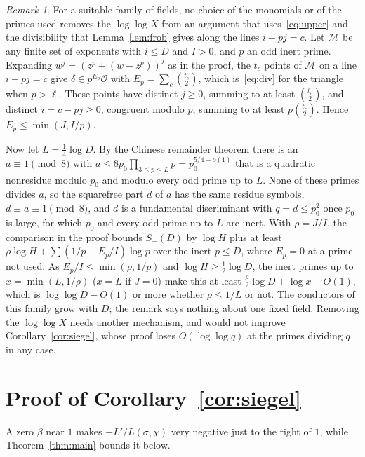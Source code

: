 \documentclass[11pt]{amsart}
\theoremstyle{remark}
\newtheorem{remark}[theorem]{Remark}
\newcommand{\cO}{\mathcal{O}}
\newcommand{\cM}{\mathcal{M}}
\begin{document}
\begin{remark}\label{rem:loglog}
For a suitable family of fields, no choice of the monomials or of the primes used removes the $\log\log X$ from an
argument that uses~\eqref{eq:upper} and the divisibility that Lemma~\ref{lem:frob} gives along the lines $i+pj=c$.
Let $\cM$ be any finite set of exponents with $i\le D$ and $I>0$, and $p$ an odd inert prime. Expanding $w^j=(z^p+(w-z^p))^j$ as in the proof, the $t_c$ points
of $\cM$ on a line $i+pj=c$ give $\delta\in p^{E_p}\cO$ with $E_p=\sum_c\binom{t_c}2$, which is~\eqref{eq:div} for
the triangle when $p>\ell$. These points have distinct $j\ge0$, summing to at least $\binom{t_c}2$, and distinct $i=c-pj\ge0$,
congruent modulo $p$, summing to at least $p\binom{t_c}2$. Hence $E_p\le\min(J,I/p)$.

Now let $L=\frac14\log D$. By the Chinese remainder theorem there is an $a\equiv1\pmod8$ with
$a\le8p_0\prod_{3\le p\le L}p=p_0^{5/4+o(1)}$ that is a quadratic nonresidue modulo $p_0$ and modulo every odd prime
up to $L$. None of these primes divides $a$, so the squarefree part $d$ of $a$ has the same residue symbols, $d\equiv
a\equiv1\pmod 8$, and $d$ is a fundamental discriminant with $q=d\le p_0^2$ once $p_0$ is large, for which $p_0$ and
every odd prime up to $L$ are inert. With $\rho=J/I$, the comparison in the proof bounds $S_-(D)$ by $\log H$ plus at
least $\rho\log H+\sum(1/p-E_p/I)\log p$ over the inert $p\le D$, where $E_p=0$ at a prime not used. As
$E_p/I\le\min(\rho,1/p)$ and $\log H\ge\frac12\log D$, the inert primes up to $x=\min(L,1/\rho)$ ($x=L$ if $J=0$) make this at least
$\frac\rho2\log D+\log x-O(1)$, which is $\log\log D-O(1)$ or more whether $\rho\le1/L$ or not. The conductors of this
family grow with $D$; the remark says nothing about one fixed field. Removing the $\log\log X$ needs another
mechanism, and would not improve Corollary~\ref{cor:siegel}, whose proof loses $O(\log\log q)$ at the primes dividing
$q$ in any case.
\end{remark}

\section{Proof of Corollary~\ref{cor:siegel}}\label{sec:cor}

A zero $\beta$ near $1$ makes $-L'/L(\sigma,\chi)$ very negative just to the right of $1$, while
Theorem~\ref{thm:main} bounds it below.
\end{document}
